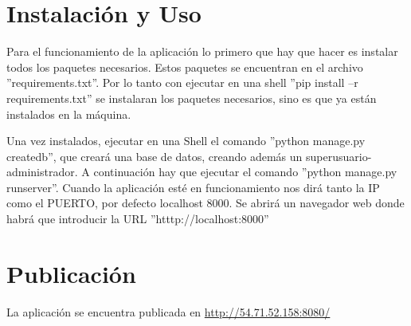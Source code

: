 \cleardoublepage
\appendix
\chapter{Instalación y Uso}
\label{app:instalacion}


Para el funcionamiento de la aplicación lo primero que hay que hacer es instalar todos los paquetes necesarios. Estos paquetes se encuentran en el archivo ''requirements.txt''. Por lo tanto con ejecutar en una shell ''pip install –r requirements.txt'' se instalaran los paquetes necesarios, sino es que ya están instalados en la máquina.


Una vez instalados, ejecutar en una Shell el comando ''python manage.py createdb'', que creará una base de datos, creando además un superusuario-administrador. A continuación hay que ejecutar el comando ''python manage.py runserver''. Cuando la aplicación esté en funcionamiento nos dirá tanto la IP como el PUERTO, por defecto localhost 8000. Se abrirá un navegador web donde habrá que introducir la URL ''htttp://localhost:8000''

\cleardoublepage
\chapter{Publicación}
\label{app:publicacion}

La aplicación se encuentra publicada en \url{http://54.71.52.158:8080/}